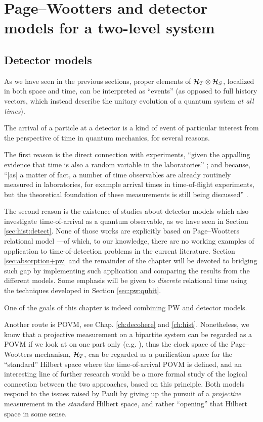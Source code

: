 \section{Page--Wootters and detector models for a two-level system}

\subsection{Detector models}

As we have seen in the previous sections,
proper elements of $\mathcal{H}_T \otimes \mathcal{H}_S$,
localized in both space and time,
can be interpreted as ``events''
(as opposed to full history vectors, which instead describe the unitary evolution
of a quantum system \emph{at all times}).

The arrival of a particle at a detector
is a kind of event
of particular interest from the perspective of time
in quantum mechanics, for several reasons.

The first reason
is the direct connection with experiments,
``given the appalling evidence that time is also a random variable in the laboratories''
\parencite[]{TQM2};
and because,
``{[as]} a matter of fact, a number of time observables are already routinely measured in laboratories,
for example arrival times in time-of-flight experiments,
but the theoretical foundation of these measurements is still being discussed''
\parencite[Preface to the First Ed.]{TQM1}.

The second reason is the existence of studies
about detector models which also investigate
time-of-arrival as a quantum observable,
as we have seen in Section \ref{sec:hist:detect}.
None of those works are explicitly
based on Page--Wootters relational model ---of which, to our knowledge,
there are no working examples of application to
time-of-detection problems in the current literature.
Section \ref{sec:absorption+pw} and the remainder of the chapter
will be devoted to bridging such gap
by implementing such application
and comparing
the results from the different models.
Some emphasis will be given to
\emph{discrete} relational time
using the techniques developed in Section \ref{sec:pw:qubit}.

One of the goals of this chapter
is indeed combining PW and detector models.

Another route is POVM, see Chap. \ref{ch:decohere} and \ref{ch:hist}.
Nonetheless, we know that a projective measurement on a bipartite system
can be regarded as a POVM
if we look at
on one part only (e.g. \cite{Paris2012}),
thus the clock space of the Page--Wootters mechanism, $\mathcal{H}_T$,
can be regarded as a purification space \parencite{Paris2012} for the ``standard''
Hilbert space where the time-of-arrival POVM is defined,
and an interesting line of further research would be a more formal
study of the logical connection between the two approaches, based on this principle.
Both models respond to the issues raised by Pauli
by giving up
the pursuit of
a \emph{projective} measurement in the \emph{standard} Hilbert space,
and rather ``opening'' that Hilbert space in some sense.



